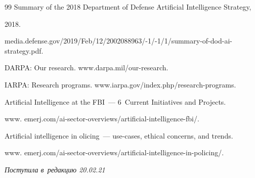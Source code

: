 {{\begin{thebibliography}{99}
Summary of the 2018 Department of Defense Artificial Intelligence Strategy,\linebreak 


2018.


     {\sf media.defense.gov/2019/Feb/12/2002088963/-1/-1/1/summary-of-dod-ai-strategy.pdf}.




DARPA: Our research. {\sf www.darpa.mil/our-research}.




IARPA: Research programs. {\sf www.iarpa.gov/index.php/research-programs}.







Artificial Intelligence at the FBI~--- 6~Current Initiatives and Projects.


{\sf www. emerj.com/ai-sector-overviews/artificial-intelligence-fbi/}.




Artificial intelligence in olicing~--- use-cases, ethical concerns, and trends.


{\sf www. emerj.com/ai-sector-overviews/artificial-intelligence-in-policing/}.


\end{thebibliography}


}}





\vspace*{-6pt}





\hfill{\small\textit{Поступила в~редакцию 20.02.21}}


\pagebreak























\newpage





